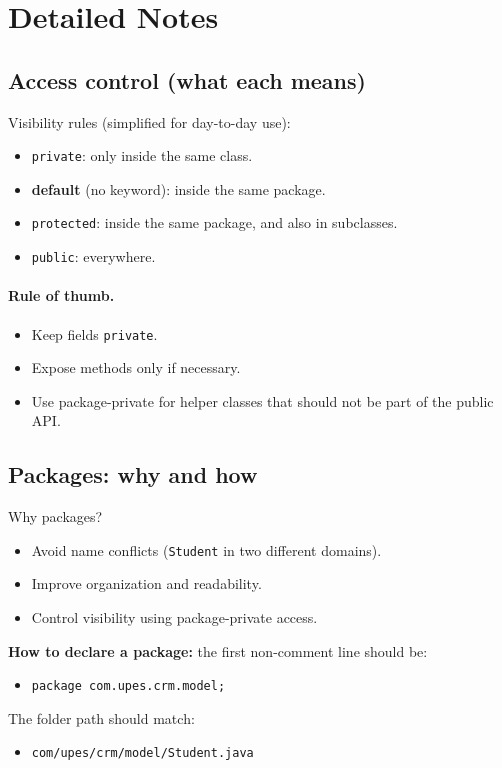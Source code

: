 \documentclass[11pt]{article}
\begin{document}
\section{Detailed Notes}
\subsection{Access control (what each means)}
Visibility rules (simplified for day-to-day use):
\begin{itemize}
  \item \texttt{private}: only inside the same class.
  \item \textbf{default} (no keyword): inside the same package.
  \item \texttt{protected}: inside the same package, and also in subclasses.
  \item \texttt{public}: everywhere.
\end{itemize}

\paragraph{Rule of thumb.}
\begin{itemize}
  \item Keep fields \texttt{private}.
  \item Expose methods only if necessary.
  \item Use package-private for helper classes that should not be part of the public API.
\end{itemize}

\subsection{Packages: why and how}
Why packages?
\begin{itemize}
  \item Avoid name conflicts (\texttt{Student} in two different domains).
  \item Improve organization and readability.
  \item Control visibility using package-private access.
\end{itemize}

\textbf{How to declare a package:} the first non-comment line should be:
\begin{itemize}
  \item \texttt{package com.upes.crm.model;}
\end{itemize}
The folder path should match:
\begin{itemize}
  \item \texttt{com/upes/crm/model/Student.java}
\end{itemize}
\end{document}
